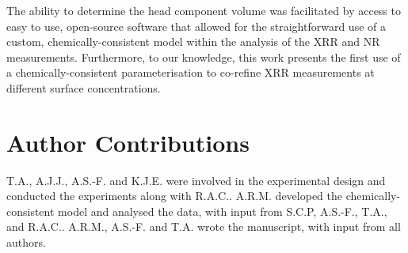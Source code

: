 \documentclass[amsmath,amssymb,twocolumn,superscriptaddress]{revtex4-1}
\begin{document}
The ability to determine the head component volume was facilitated by access to easy to use, open-source software that allowed for the straightforward use of a custom, chemically-consistent model within the analysis of the XRR and NR measurements.
Furthermore, to our knowledge, this work presents the first use of a chemically-consistent parameterisation to co-refine XRR measurements at different surface concentrations.

\section{Author Contributions}
T.A., A.J.J., A.S.-F. and K.J.E. were involved in the experimental design and conducted the experiments along with R.A.C..
A.R.M. developed the chemically-consistent model and analysed the data, with input from S.C.P, A.S.-F., T.A., and R.A.C..
A.R.M., A.S.-F. and T.A. wrote the manuscript, with input from all authors.


\end{document}
